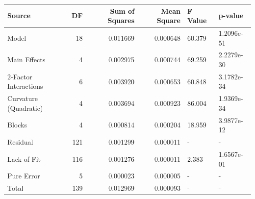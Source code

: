 \begin{tabular}{lrrrll}
\toprule
Source & DF & Sum of Squares & Mean Square & F Value & p-value \\
\midrule
Model & 18 & 0.011669 & 0.000648 & 60.379 & 1.2096e-51 \\
  Main Effects & 4 & 0.002975 & 0.000744 & 69.259 & 2.2279e-30 \\
  2-Factor Interactions & 6 & 0.003920 & 0.000653 & 60.848 & 3.1782e-34 \\
  Curvature (Quadratic) & 4 & 0.003694 & 0.000923 & 86.004 & 1.9369e-34 \\
  Blocks & 4 & 0.000814 & 0.000204 & 18.959 & 3.9877e-12 \\
Residual & 121 & 0.001299 & 0.000011 & - & - \\
  Lack of Fit & 116 & 0.001276 & 0.000011 & 2.383 & 1.6567e-01 \\
  Pure Error & 5 & 0.000023 & 0.000005 & - & - \\
Total & 139 & 0.012969 & 0.000093 & - & - \\
\bottomrule
\end{tabular}
